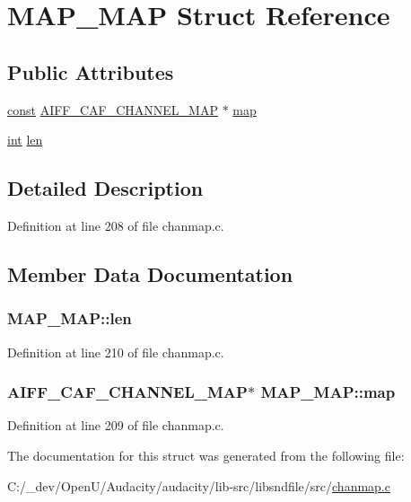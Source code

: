 \hypertarget{struct_m_a_p___m_a_p}{}\section{M\+A\+P\+\_\+\+M\+AP Struct Reference}
\label{struct_m_a_p___m_a_p}
\subsection*{Public Attributes}
\begin{DoxyCompactItemize}
\item 
\hyperlink{getopt1_8c_a2c212835823e3c54a8ab6d95c652660e}{const} \hyperlink{struct_a_i_f_f___c_a_f___c_h_a_n_n_e_l___m_a_p}{A\+I\+F\+F\+\_\+\+C\+A\+F\+\_\+\+C\+H\+A\+N\+N\+E\+L\+\_\+\+M\+AP} $\ast$ \hyperlink{struct_m_a_p___m_a_p_afda073694ad65780a580f3c9c853cbcc}{map}
\item 
\hyperlink{xmltok_8h_a5a0d4a5641ce434f1d23533f2b2e6653}{int} \hyperlink{struct_m_a_p___m_a_p_ab262fd3921065f8ed1ce064915341d91}{len}
\end{DoxyCompactItemize}


\subsection{Detailed Description}


Definition at line 208 of file chanmap.\+c.



\subsection{Member Data Documentation}
\subsubsection[{\texorpdfstring{len}{len}}]{ M\+A\+P\+\_\+\+M\+A\+P\+::len}\hypertarget{struct_m_a_p___m_a_p_ab262fd3921065f8ed1ce064915341d91}{}\label{struct_m_a_p___m_a_p_ab262fd3921065f8ed1ce064915341d91}


Definition at line 210 of file chanmap.\+c.

\subsubsection[{\texorpdfstring{map}{map}}]{ {\bf A\+I\+F\+F\+\_\+\+C\+A\+F\+\_\+\+C\+H\+A\+N\+N\+E\+L\+\_\+\+M\+AP}$\ast$ M\+A\+P\+\_\+\+M\+A\+P\+::map}\hypertarget{struct_m_a_p___m_a_p_afda073694ad65780a580f3c9c853cbcc}{}\label{struct_m_a_p___m_a_p_afda073694ad65780a580f3c9c853cbcc}


Definition at line 209 of file chanmap.\+c.



The documentation for this struct was generated from the following file\+:\begin{DoxyCompactItemize}
\item 
C\+:/\+\_\+dev/\+Open\+U/\+Audacity/audacity/lib-\/src/libsndfile/src/\hyperlink{chanmap_8c}{chanmap.\+c}\end{DoxyCompactItemize}
